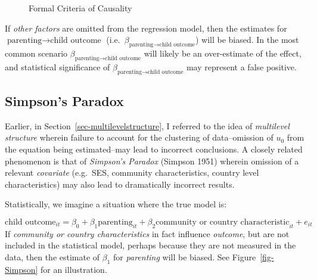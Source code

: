 \documentclass[
  letterpaper,
  DIV=11,
  numbers=noendperiod]{scrreprt}
\begin{document}
\begin{figure}

{\centering 

}

\caption{\label{fig-causalitysubstantive}Formal Criteria of Causality}

\end{figure}

If \emph{other factors} are omitted from the regression model, then the
estimates for \(\text{parenting} \rightarrow \text{child outcome}\)
(i.e.~\(\beta_{\text{parenting} \rightarrow \text{child outcome}}\))
will be biased. In the most common scenario
\(\beta_{\text{parenting} \rightarrow \text{child outcome}}\) will
likely be an over-estimate of the effect, and statistical significance
of \(\beta_{\text{parenting} \rightarrow \text{child outcome}}\) may
represent a false positive.

\hypertarget{simpsons-paradox}{%
\subsection{Simpson's Paradox}\label{simpsons-paradox}}

Earlier, in Section~\ref{sec-multilevelstructure}, I referred to the
idea of \emph{multilevel structure} wherein failure to account for the
clustering of data--omission of \(u_0\) from the equation being
estimated--may lead to incorrect conclusions. A closely related
phenomenon is that of \emph{Simpson's Paradox} (Simpson 1951) wherein
omission of a relevant \emph{covariate} (e.g.~SES, community
characteristics, country level characteristics) may also lead to
dramatically incorrect results.

Statistically, we imagine a situation where the true model is:

\[\text{child outcome}_{it} = \beta_0 + \beta_1 \text{parenting}_{it} + \beta_2 \text{community or country characteristic}_{it} + e_{it}\]
If \emph{community or country characteristics} in fact influence
\emph{outcome}, but are not included in the statistical model, perhaps
because they are not measured in the data, then the estimate of
\(\beta_1\) for \emph{parenting} will be biased. See
Figure~\ref{fig-Simpson} for an illustration.
\end{document}
